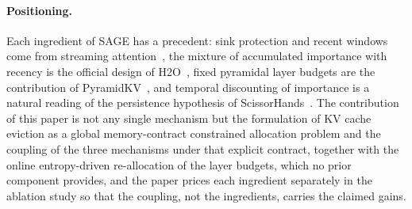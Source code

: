 \paragraph{Positioning.}
Each ingredient of SAGE has a precedent: sink protection and recent
windows come from streaming attention~\cite{xiao2023efficient}, the
mixture of accumulated importance with recency is the official design
of H2O~\cite{zhang2023h2o}, fixed pyramidal layer budgets are the
contribution of PyramidKV~\cite{zhang2024pyramidkv}, and temporal
discounting of importance is a natural reading of the persistence
hypothesis of ScissorHands~\cite{liu2023scissorhands}. The contribution
of this paper is not any single mechanism but the formulation of KV
cache eviction as a global memory-contract constrained allocation
problem and the coupling of the
three mechanisms under that explicit contract, together with the online
entropy-driven re-allocation of the layer budgets, which no prior
component provides, and the paper prices each ingredient separately in
the ablation study so that the coupling, not the ingredients, carries
the claimed gains.
